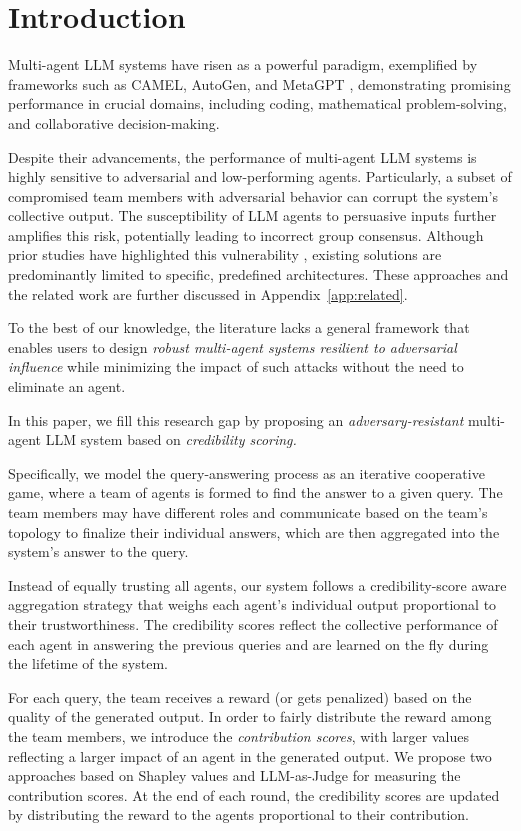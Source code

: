 \section{Introduction}\label{sec:intro}

Multi-agent LLM systems have risen as a powerful paradigm, exemplified by frameworks such as CAMEL, AutoGen, and MetaGPT \cite{autogen, metagpt, camel}, demonstrating promising performance in crucial domains, including coding, mathematical problem-solving, and collaborative decision-making.

Despite their advancements, the performance of multi-agent LLM systems is highly sensitive to adversarial and low-performing agents. 
Particularly, a subset of compromised team members with adversarial behavior can corrupt the system’s collective output. The susceptibility of LLM agents to persuasive inputs further amplifies this risk, potentially leading to incorrect group consensus. 
Although prior studies have highlighted this vulnerability \cite{psysafe, multiagent-debate-attack, MALLM-survey-2}, existing solutions are predominantly limited to specific, predefined architectures. These approaches and the related work are further discussed in Appendix~\ref{app:related}.

To the best of our knowledge, the literature lacks a general framework that enables users to design {\em robust multi-agent systems resilient to adversarial influence} while minimizing the impact of such attacks without the need to eliminate an agent.

In this paper, we fill this research gap by proposing an {\em adversary-resistant} multi-agent LLM system based on {\em credibility scoring.}

Specifically, we model the query-answering process as an iterative cooperative game, where a team of agents is formed to find the answer to a given query. The team members may have different roles and communicate based on the team's topology to finalize their individual answers, which are then aggregated into the system's answer to the query.

Instead of equally trusting all agents, our system follows a credibility-score aware aggregation strategy that weighs each agent's individual output proportional to their trustworthiness.
The credibility scores reflect the collective performance of each agent in answering the previous queries and are learned on the fly during the lifetime of the system.

For each query, the team receives a reward (or gets penalized) based on the quality of the generated output.
In order to fairly distribute the reward among the team members, we introduce the {\em contribution scores}, with larger values reflecting a larger impact of an agent in the generated output.
We propose two approaches based on Shapley values and LLM-as-Judge for measuring the contribution scores.
At the end of each round, the credibility scores are updated by distributing the reward to the agents proportional to their contribution. 

